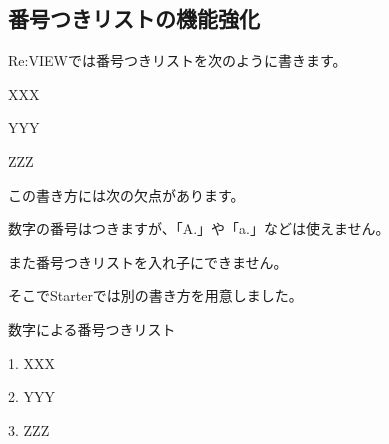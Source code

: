 \subsection*{番号つきリストの機能強化}
\label{sec:1-1-3}
\label{subsec-olist}

Re:VIEWでは番号つきリストを次のように書きます。

\begin{starterprogram}\end{starterprogram}
\noindent
{}

\starterresult

\begin{starterenumerate}
\item XXX
\item YYY
\item ZZZ
\end{starterenumerate}

\endstarterresult

この書き方には次の欠点があります。

\begin{starteritemize}
\item 数字の番号はつきますが、「A.」や「a.」などは使えません。
\item また番号つきリストを入れ子にできません。
\end{starteritemize}

そこでStarterでは別の書き方を用意しました。

\begin{starterprogram}\end{starterprogram}
\noindent
{}

\starterresult

数字による番号つきリスト

\begin{starterenumerate}
\item[1.] XXX
\item[2.] YYY
\item[3.] ZZZ
\end{starterenumerate}

